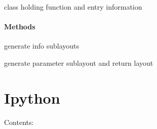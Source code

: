 \documentclass[letterpaper,10pt,english]{sphinxmanual}
\begin{document}
\begin{fulllineitems}
\label{AuxillaryFunctionWidget:Auxfuncwidget.AuxillaryFunctionWidget}
class holding function and entry information
\paragraph{Methods}

\begin{fulllineitems}
\label{AuxillaryFunctionWidget:Auxfuncwidget.AuxillaryFunctionWidget.calculate}
\end{fulllineitems}


\begin{fulllineitems}
\label{AuxillaryFunctionWidget:Auxfuncwidget.AuxillaryFunctionWidget.generate_info_widgets}
generate info sublayouts

\end{fulllineitems}


\begin{fulllineitems}
\label{AuxillaryFunctionWidget:Auxfuncwidget.AuxillaryFunctionWidget.generate_params_widgets}
generate parameter sublayout and return layout

\end{fulllineitems}


\begin{fulllineitems}
\label{AuxillaryFunctionWidget:Auxfuncwidget.AuxillaryFunctionWidget.get_params}
\end{fulllineitems}


\end{fulllineitems}



\section{Ipython}
\label{Ipython::doc}\label{Ipython:ipython}
Contents:
\end{document}
